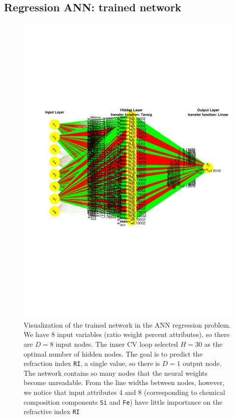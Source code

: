 \newpage
\subsection{Regression ANN: trained network}

\begin{figure}[H]
    \centering
    \includegraphics[width=1.0\textwidth]{fig/regression/ANN_reg_evaluating_best_model_trained_network.pdf}
    \caption{Visualization of the trained network in the ANN regression problem. We have 8 input variables (ratio weight percent attributes), so there are $D=8$ input nodes. The inner CV loop selected $H=30$ as the optimal number of hidden nodes. The goal is to predict the refraction index \texttt{RI}, a single value, so there is $D = 1$ output node. The network contains so many nodes that the neural weights become unreadable. From the line widths between nodes, however, we notice that input attributes 4 and 8 (corresponding to chemical composition components \texttt{Si} and \texttt{Fe}) have little importance on the refractive index \texttt{RI}}
\end{figure}